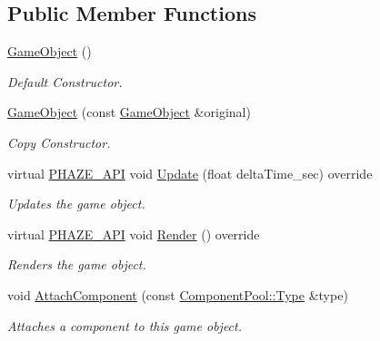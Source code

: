 \subsection*{Public Member Functions}
\begin{DoxyCompactItemize}
\item 
\mbox{\label{class_game_object_a0348e3ee2e83d56eafca7a3547f432c4}} 
\mbox{\hyperlink{class_game_object_a0348e3ee2e83d56eafca7a3547f432c4}{Game\+Object}} ()
\begin{DoxyCompactList}\small\item\em Default Constructor. \end{DoxyCompactList}\item 
\mbox{\hyperlink{class_game_object_a0cefa9305b62d18a11d7c1182fcbf5bc}{Game\+Object}} (const \mbox{\hyperlink{class_game_object}{Game\+Object}} \&original)
\begin{DoxyCompactList}\small\item\em Copy Constructor. \end{DoxyCompactList}\item 
virtual \mbox{\hyperlink{_macros_8h_a9ce0e6835f82908079752fa4ebe70dc9}{P\+H\+A\+Z\+E\+\_\+\+A\+PI}} void \mbox{\hyperlink{class_game_object_a931541422ec57567e1d46436d97b874c}{Update}} (float delta\+Time\+\_\+sec) override
\begin{DoxyCompactList}\small\item\em Updates the game object. \end{DoxyCompactList}\item 
\mbox{\label{class_game_object_af9450b108e616d4e30c7a88534517df0}} 
virtual \mbox{\hyperlink{_macros_8h_a9ce0e6835f82908079752fa4ebe70dc9}{P\+H\+A\+Z\+E\+\_\+\+A\+PI}} void \mbox{\hyperlink{class_game_object_af9450b108e616d4e30c7a88534517df0}{Render}} () override
\begin{DoxyCompactList}\small\item\em Renders the game object. \end{DoxyCompactList}\item 
void \mbox{\hyperlink{class_game_object_a1e8c34679f8e8decbd9628a890f47c7f}{Attach\+Component}} (const \mbox{\hyperlink{class_component_pool_a7a88ce8bc60d1936539c2b9757b7e9ff}{Component\+Pool\+::\+Type}} \&type)
\begin{DoxyCompactList}\small\item\em Attaches a component to this game object. \end{DoxyCompactList}\item 

\end{DoxyCompactItemize}
